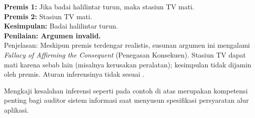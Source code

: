 \begin{contoh}
\textbf{Premis 1:} Jika badai halilintar turun, maka stasiun TV mati. \\
\textbf{Premis 2:} Stasiun TV mati. \\
\textbf{Kesimpulan:} Badai halilintar turun. \\
\textbf{Penilaian: Argumen invalid.} \\
Penjelasan: Meskipun premis terdengar realistis, susunan argumen ini mengalami \textit{Fallacy of Affirming the Consequent} (Penegasan Konsekuen). Stasiun TV dapat mati karena sebab lain (misalnya kerusakan peralatan); kesimpulan tidak dijamin oleh premis. Aturan inferensinya tidak sesuai \cite{iep_natded}.
\end{contoh}
Mengkaji kesalahan inferensi seperti pada contoh di atas merupakan kompetensi penting bagi auditor sistem informasi saat menyusun spesifikasi persyaratan alur aplikasi.
